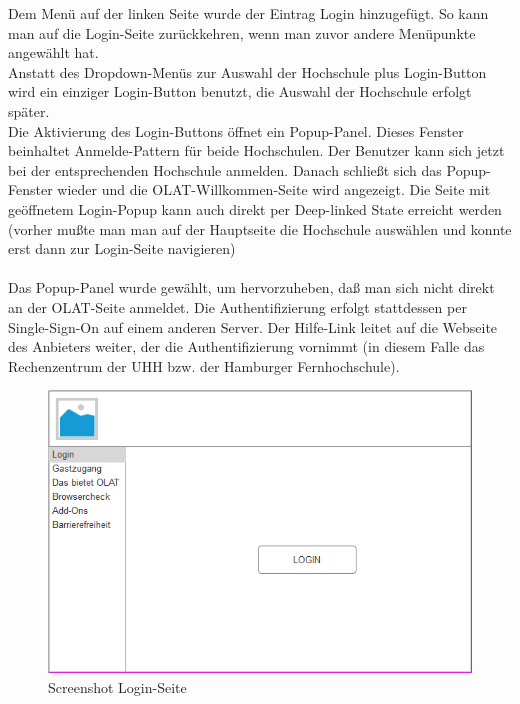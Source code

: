 \documentclass[a4paper,10pt]{article}
\begin{document}
\begin{enumerate}
\begin{enumerate}
Dem Menü auf der linken Seite wurde der Eintrag Login hinzugefügt. So kann man auf die Login-Seite zurückkehren, wenn man zuvor andere Menüpunkte angewählt hat.\\
Anstatt des Dropdown-Menüs zur Auswahl der Hochschule plus Login-Button wird ein einziger Login-Button benutzt, die Auswahl der Hochschule erfolgt später.\\
Die Aktivierung des Login-Buttons öffnet ein Popup-Panel. Dieses Fenster beinhaltet Anmelde-Pattern für beide Hochschulen. Der Benutzer kann sich jetzt bei der entsprechenden Hochschule anmelden. Danach schließt sich das Popup-Fenster wieder und die OLAT-Willkommen-Seite wird angezeigt. Die Seite mit geöffnetem Login-Popup kann auch direkt per Deep-linked State erreicht werden (vorher mußte man man auf der Hauptseite die Hochschule auswählen und konnte erst dann zur Login-Seite navigieren)\\\\
Das Popup-Panel wurde gewählt, um hervorzuheben, daß man sich nicht direkt an der OLAT-Seite anmeldet. Die Authentifizierung erfolgt stattdessen per Single-Sign-On auf einem anderen Server. Der Hilfe-Link leitet auf die Webseite des Anbieters weiter, der die Authentifizierung vornimmt (in diesem Falle das Rechenzentrum der UHH bzw. der Hamburger Fernhochschule).
\newpage
\begin{figure}[H]
	\centering
	\includegraphics[width=1.0\textwidth]{Screenshot-Login.png} 
	\caption{Screenshot Login-Seite}
	\label{fig1}
\end{figure}
\begin{figure}[H]
	\centering

\end{figure}
\end{enumerate}
\end{enumerate}
\end{document}

